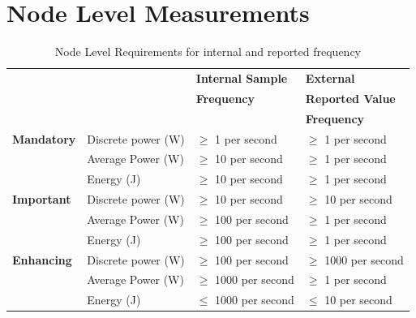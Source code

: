 \section{Node Level Measurements}

\begin{table}[htbp]
\caption{Node Level Requirements for internal and reported frequency}
\label{tab:nodelevel}
\begin{tabular}{|p{3.0cm}|p{3.5cm}|p{3.5cm}|p{3.5cm}|} \hline
& & \textbf{Internal Sample}&\textbf{External}\\ 
& & \textbf{Frequency}&\textbf{Reported Value}\\ 
& & & \textbf{Frequency}\\ \hline

\textbf{Mandatory} &
Discrete power (W)&
\mbox{$ \ge $} 1 per second &
\mbox{$ \ge $} 1 per second \\

& 
Average Power (W) &
\mbox{$ \ge $} 10 per second &
\mbox{$ \ge $} 1 per second \\

& 
Energy (J) &
\mbox{$ \ge $} 10 per second &
\mbox{$ \ge $} 1 per second \\ \hline

\textbf{Important} & 
Discrete power (W)&
\mbox{$ \ge $} 10 per second &
\mbox{$ \ge $} 10 per second \\

& 
Average Power (W) &
\mbox{$ \ge $} 100 per second &
\mbox{$ \ge $} 1 per second \\

& 
Energy (J) &
\mbox{$ \ge $} 100 per second &
\mbox{$ \ge $} 1 per second \\ \hline 

\textbf{Enhancing} & 
Discrete power (W)&
\mbox{$ \ge $} 100 per second &
\mbox{$ \ge $} 1000 per second \\

& 
Average Power (W) &
\mbox{$ \ge $} 1000 per second &
\mbox{$ \ge $} 1 per second \\

& 
Energy (J) &
\mbox{$ \le $} 1000 per second &
\mbox{$ \le $} 10 per second \\ \hline

\end{tabular}
\end{table}

